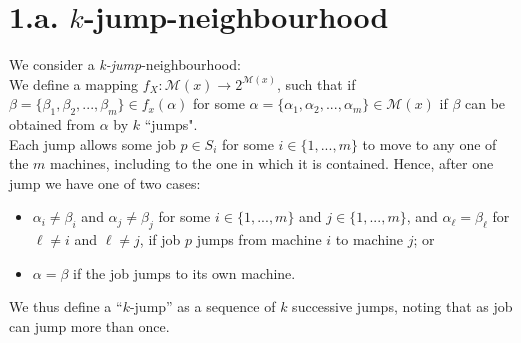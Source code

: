 \documentclass[12pt,a4paper,reqno]{article}
\begin{document}
\section*{1.a. $k$-jump-neighbourhood}

We consider a \textit{k-jump}-neighbourhood: \\

We define a mapping $f_X: \mathcal{M}(x) \rightarrow 2^{\mathcal{M}(x)}$, such that if $\beta = \{\beta_1,\beta_2,...,\beta_m \} \in f_x(\alpha)$ for some $\alpha = \{\alpha_1,\alpha_2,...,\alpha_m \} \in \mathcal{M}(x)$ if $\beta$ can be obtained from $\alpha$ by $k$ ``jumps". \\

Each jump allows some job $p \in S_i$ for some $i \in \{1,...,m\}$ to move to any one of the $m$ machines, including to the one in which it is contained. Hence, after one jump we have one of two cases:
\begin{itemize}
\item $\alpha_i \neq \beta_i$ and $\alpha_j \neq \beta_j$ for some $i \in \{1,...,m\}$ and $j \in \{1,...,m\}$, and $\alpha_\ell = \beta_\ell$ for $\ell \neq i$ and $\ell \neq j$, if job $p$ jumps from machine $i$ to machine $j$; or
\item $\alpha = \beta$ if the job jumps to its own machine.
\end{itemize}

We thus define a ``$k$-jump'' as a sequence of $k$ successive jumps, noting that as job can jump more than once. \\
\end{document}
